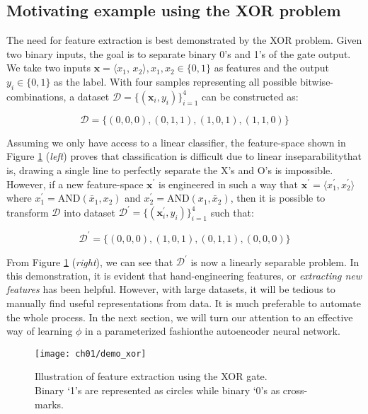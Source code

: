 \subsection{Motivating example using the XOR problem}

\par The need for feature extraction is best demonstrated by the XOR problem.
Given two binary inputs, the goal is to separate binary 0's and 1's of the gate
output. We take two inputs $\mathbf{x} = \langle x_{1}$, $x_{2} \rangle, x_1,
x_2 \in \{0,1\}$ as features and the output $y_{i} \in \{0,1\}$ as the label.
With four samples representing all possible bitwise-combinations, a dataset
$\mathcal{D}=\{(\mathbf{x}_{i}, y_{i})\}_{i=1}^{4}$ can be constructed as:

\[
    \mathcal{D} = \{(0,0,0), (0,1,1), (1,0,1), (1,1,0)\}
\]

Assuming we only have access to a linear classifier, the feature-space shown in
Figure \ref{demo:xor} (\textit{left}) proves that classification is difficult
due to linear inseparability\textemdash that is, drawing a single line to
perfectly separate the X's and O's is impossible.  However, if a new
feature-space $\mathbf{x}^{\prime}$ is engineered in such a way that
$\mathbf{x}^{\prime} = \langle {x}^{\prime}_{1}, {x}^{\prime}_2 \rangle$ where
$x^{\prime}_{1} = \text{AND}(\bar{x}_{1}, x_{2})$ and $x^{\prime}_{2} =
\text{AND}(x_{1}, \bar{x}_{2})$, then it is possible to transform $\mathcal{D}$
into dataset $\mathcal{D}^{\prime}=\{(\mathbf{x}^{\prime}_{i},
y_{i})\}_{i=1}^{4}$ such that:

\[
    \mathcal{D}^{\prime} = \{(0,0,0), (1,0,1), (0,1,1), (0,0,0)\}
\]

\par From Figure \ref{demo:xor} (\textit{right}), we can see that
$\mathcal{D}^{\prime}$ is now a linearly separable problem. In this
demonstration, it is evident that hand-engineering features, or
\textit{extracting new features} has been helpful. However, with large
datasets, it will be tedious to manually find useful representations from data.
It is much preferable to automate the whole process. In the next section, we
will turn our attention to an effective way of learning $\phi$ in a
parameterized fashion\textemdash the autoencoder neural network.

\begin{figure}[!t]
  \centering
  \texttt{[image: ch01/demo\_xor]}
  \caption[Illustration of feature extraction using the XOR gate]
    {Illustration of feature extraction using the XOR gate.\\ Binary `1's are
    represented as circles while binary `0's as cross-marks.}
  \label{demo:xor}
\end{figure}

